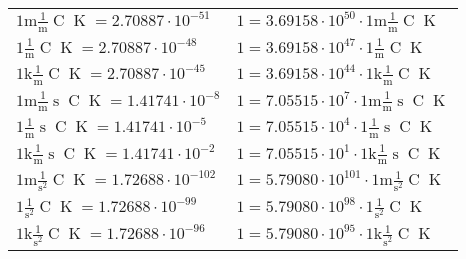 \begin{center}
\begin{longtable}{l l}
{\color{gray}$1 \bm{\mathrm{ m}}\frac1{\operatorname{m}}{}{\operatorname{C}}{\operatorname{K}} = 2.70887\cdot10^{-51} $}   & {\color{gray}$ 1 = 3.69158\cdot10^{50} \cdot 1 \bm{\mathrm{ m}}\frac1{\operatorname{m}}{}{\operatorname{C}}{\operatorname{K}}$}  \\
{\color{black}$1 \bm{\mathrm{ }}\frac1{\operatorname{m}}{}{\operatorname{C}}{\operatorname{K}} = 2.70887\cdot10^{-48} $}   & {\color{black}$ 1 = 3.69158\cdot10^{47} \cdot 1 \bm{\mathrm{ }}\frac1{\operatorname{m}}{}{\operatorname{C}}{\operatorname{K}}$}  \\
{\color{gray}$1 \bm{\mathrm{ k}}\frac1{\operatorname{m}}{}{\operatorname{C}}{\operatorname{K}} = 2.70887\cdot10^{-45} $}   & {\color{gray}$ 1 = 3.69158\cdot10^{44} \cdot 1 \bm{\mathrm{ k}}\frac1{\operatorname{m}}{}{\operatorname{C}}{\operatorname{K}}$}  \\
{\color{gray}$1 \bm{\mathrm{ m}}\frac1{\operatorname{m}}{\operatorname{s}}{\operatorname{C}}{\operatorname{K}} = 1.41741\cdot10^{-8} $}   & {\color{gray}$ 1 = 7.05515\cdot10^{7} \cdot 1 \bm{\mathrm{ m}}\frac1{\operatorname{m}}{\operatorname{s}}{\operatorname{C}}{\operatorname{K}}$}  \\
{\color{black}$1 \bm{\mathrm{ }}\frac1{\operatorname{m}}{\operatorname{s}}{\operatorname{C}}{\operatorname{K}} = 1.41741\cdot10^{-5} $}   & {\color{black}$ 1 = 7.05515\cdot10^{4} \cdot 1 \bm{\mathrm{ }}\frac1{\operatorname{m}}{\operatorname{s}}{\operatorname{C}}{\operatorname{K}}$}  \\
{\color{gray}$1 \bm{\mathrm{ k}}\frac1{\operatorname{m}}{\operatorname{s}}{\operatorname{C}}{\operatorname{K}} = 1.41741\cdot10^{-2} $}   & {\color{gray}$ 1 = 7.05515\cdot10^{1} \cdot 1 \bm{\mathrm{ k}}\frac1{\operatorname{m}}{\operatorname{s}}{\operatorname{C}}{\operatorname{K}}$}  \\
{\color{gray}$1 \bm{\mathrm{ m}}{}\frac1{\operatorname{s}^2}{\operatorname{C}}{\operatorname{K}} = 1.72688\cdot10^{-102} $}   & {\color{gray}$ 1 = 5.79080\cdot10^{101} \cdot 1 \bm{\mathrm{ m}}{}\frac1{\operatorname{s}^2}{\operatorname{C}}{\operatorname{K}}$}  \\
{\color{black}$1 \bm{\mathrm{ }}{}\frac1{\operatorname{s}^2}{\operatorname{C}}{\operatorname{K}} = 1.72688\cdot10^{-99} $}   & {\color{black}$ 1 = 5.79080\cdot10^{98} \cdot 1 \bm{\mathrm{ }}{}\frac1{\operatorname{s}^2}{\operatorname{C}}{\operatorname{K}}$}  \\
{\color{gray}$1 \bm{\mathrm{ k}}{}\frac1{\operatorname{s}^2}{\operatorname{C}}{\operatorname{K}} = 1.72688\cdot10^{-96} $}   & {\color{gray}$ 1 = 5.79080\cdot10^{95} \cdot 1 \bm{\mathrm{ k}}{}\frac1{\operatorname{s}^2}{\operatorname{C}}{\operatorname{K}}$}  \\

\end{longtable}
\end{center}
